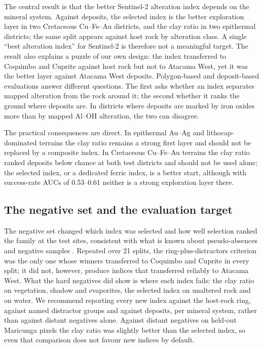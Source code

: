 \documentclass[pdflatex,sn-basic]{sn-jnl}
\begin{document}
The central result is that the better Sentinel-2 alteration index depends on the mineral system. Against deposits, the selected index is the better exploration layer in two Cretaceous Cu--Fe--Au districts, and the clay ratio in two epithermal districts; the same split appears against host rock by alteration class. A single ``best alteration index'' for Sentinel-2 is therefore not a meaningful target. The result also explains a puzzle of our own design: the index transferred to Coquimbo and Cuprite against host rock but not to Atacama West, yet it was the better layer against Atacama West deposits. Polygon-based and deposit-based evaluations answer different questions. The first asks whether an index separates mapped alteration from the rock around it; the second whether it ranks the ground where deposits are. In districts where deposits are marked by iron oxides more than by mapped Al--OH alteration, the two can disagree.

The practical consequences are direct. In epithermal Au--Ag and lithocap-dominated terrains the clay ratio remains a strong first layer and should not be replaced by a composite index. In Cretaceous Cu--Fe--Au terrains the clay ratio ranked deposits below chance at both test districts and should not be used alone; the selected index, or a dedicated ferric index, is a better start, although with success-rate AUCs of 0.53--0.61 neither is a strong exploration layer there.

\subsection{The negative set and the evaluation target}

The negative set changed which index was selected and how well selection ranked the family at the test sites, consistent with what is known about pseudo-absences and negative samples \citep{Phillips2009,BarbetMassin2012,Zuo2020,Zhang2025}. Repeated over 21 splits, the ring-plus-distractors criterion was the only one whose winners transferred to Coquimbo and Cuprite in every split; it did not, however, produce indices that transferred reliably to Atacama West. What the hard negatives did show is where each index fails: the clay ratio on vegetation, shadow and evaporites, the selected index on unaltered rock and on water. We recommend reporting every new index against the host-rock ring, against named distractor groups and against deposits, per mineral system, rather than against distant negatives alone. Against distant negatives on held-out Maricunga pixels the clay ratio was slightly better than the selected index, so even that comparison does not favour new indices by default.
\end{document}
